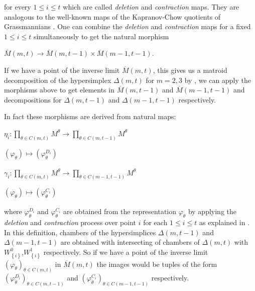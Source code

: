 \documentclass[12pt, reqno]{amsart}
\theoremstyle{definition}
\theoremstyle{remark}
\numberwithin{equation}{section}
\begin{document}
for every 
$1 \leq i\leq t$
which are called
 \emph{deletion} and \emph{contraction} maps. They are
 analogous 
 to the well-known
 maps 
 of the
  Kapranov-Chow quotients of Grassmannians \cite{Kap1}. One can combine the 
   \emph{deletion} and \emph{contraction} maps
   for a fixed 
   $1 \leq i\leq t$
    simultaneously
    to get the natural morphism
   \begin{center}
   	$
   	\overline{M}(m, t) \longrightarrow \overline{M}(m, t-1)\times \overline{M}(m-1, t-1)
   	$.
   	\end{center}
   
  
  
 If we have a point of the
  inverse limit
  	$
  \overline{M}(m, t)$, this gives us a matroid decomposition of the hypersimplex
  $\Delta(m,t)$  for $m=2,3$ by \cite[Theorem 1.14]{HHH}, we can apply the morphisms above to 
  get  elements in 
  	$
  \overline{M}(m, t-1)$
  and 
  	$
  \overline{M}(m-1, t-1)$ and decompositions for
  $\Delta(m,t-1)$ and $\Delta(m-1,t-1)$ respectively. 
  
  In fact these morphisms
  are derived from natural maps:
  
  \begin{center}
  	
  	$\eta_i:\prod\limits_{\theta\in C(m,t)}  M^\theta\longrightarrow \prod\limits_{\theta\in C(m,t-1)}  M^\theta$
  	
  	$
  	(\varphi_{\theta})_{} \mapsto (\varphi_{\theta}^{D_i})_{}
  	$
  			
  	\end{center}
  	
  	\begin{center}
  
  	$\gamma_i:\prod\limits_{\theta\in C(m,t)}  M^\theta\longrightarrow \prod\limits_{\theta\in C(m-1,t-1)}  M^\theta$
  	
  	$
  	(\varphi_{\theta})_{} \mapsto (\varphi_{\theta}^{C_i})_{}
  	$
  \end{center}
  where
  $\varphi_{\theta}^{D_i}$ and
  $\varphi_{\theta}^{C_i}$
  are obtained from the representation 
  $\varphi_{\theta}$ by applying the 
  \emph{deletion} and \emph{contraction} process over point $i$
   for each
  $1 \leq i\leq t$  as explained in 
  \cite[Definition
  3.14,Definition 3.15]{HHH}. 
   In this definition, 
  chambers of the hypersimplices
  $\Delta(m,t-1)$ and $\Delta(m-1,t-1)$
  are obtained with intersecting of chambers of 
  $\Delta(m,t)$ with 
  $W^0_{\left\{i\right\}}$,$W^1_{\left\{i\right\}}$ respectively. 
  So if we have a point of the inverse limit   
  $(\varphi_{\theta})_{\theta \in C(m,t)}$
  in
  $
  \overline{M}(m, t)$
   the images would be tuples of the form
   $(\varphi_{\theta}^{D_i})_{\theta\in C(m,t-1)}$
   and
   $(\varphi_{\theta}^{C_i})_{\theta\in C(m-1,t-1)}$ respectively.
  
\end{document}
